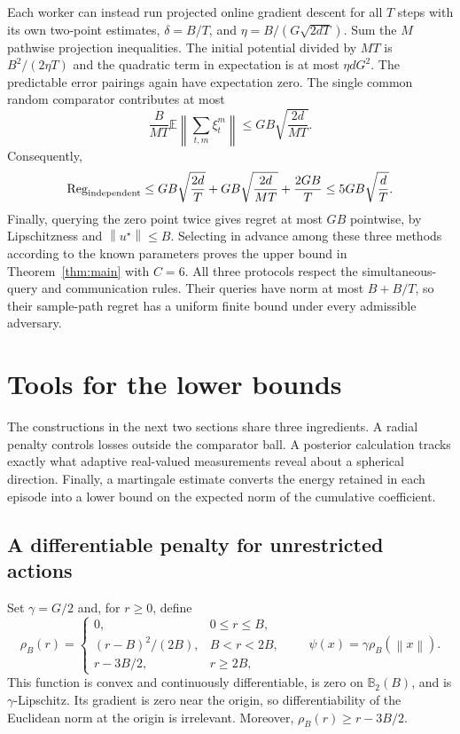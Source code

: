 \documentclass[11pt,a4paper]{article}
\numberwithin{equation}{section}
\theoremstyle{remark}
\newcommand{\E}{\mathbb E}
\newcommand{\norm}[1]{\left\lVert #1\right\rVert}
\newcommand{\B}{\mathbb B_2}
\begin{document}
Each worker can instead run projected online gradient descent for all
$T$ steps with its own two-point estimates, $\delta=B/T$, and
$\eta=B/(G\sqrt{2dT})$. Sum the $M$ pathwise projection inequalities.
The initial potential divided by $MT$ is $B^2/(2\eta T)$ and the
quadratic term in expectation is at most $\eta dG^2$.
The predictable error pairings again have expectation zero.
The single common random comparator contributes at most
\[
 \frac{B}{MT}\E\norm{\sum_{t,m}\xi_t^m}
 \le GB\sqrt{\frac{2d}{MT}}.
\]
Consequently,
\begin{equation}
 \operatorname{Reg}_{\rm independent}
 \le GB\sqrt{\frac{2d}{T}}+
       GB\sqrt{\frac{2d}{MT}}+\frac{2GB}{T}
 \le5GB\sqrt{\frac dT}.                  \label{eq:ind-bound}
\end{equation}
Finally, querying the zero point twice gives regret at most $GB$
pointwise, by Lipschitzness and $\norm{u^\star}\le B$.
Selecting in advance among these three methods according to the known
parameters proves the upper bound in Theorem~\ref{thm:main} with $C=6$.
All three protocols respect the simultaneous-query and communication rules. Their queries have norm at most $B+B/T$, so their sample-path regret has a uniform finite bound under every admissible adversary.

\section{Tools for the lower bounds}\label{sec:tools}

The constructions in the next two sections share three ingredients. A radial penalty controls losses outside the comparator ball. A posterior calculation tracks exactly what adaptive real-valued measurements reveal about a spherical direction. Finally, a martingale estimate converts the energy retained in each episode into a lower bound on the expected norm of the cumulative coefficient.

\subsection{A differentiable penalty for unrestricted actions}

Set $\gamma=G/2$ and, for $r\ge0$, define
\begin{equation}
 \rho_B(r)=
 \begin{cases}
  0, &0\le r\le B,\\
  (r-B)^2/(2B), &B<r<2B,\\
  r-3B/2, &r\ge2B,
 \end{cases}
 \qquad
 \psi(x)=\gamma\rho_B(\norm{x}).          \label{eq:penalty}
\end{equation}
This function is convex and continuously differentiable, is zero on
$\B(B)$, and is $\gamma$-Lipschitz. Its gradient is zero near the
origin, so differentiability of the Euclidean norm at the origin is
irrelevant. Moreover, $\rho_B(r)\ge r-3B/2$.
\end{document}
